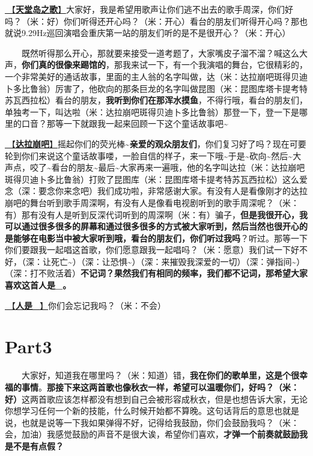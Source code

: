 \documentclass[]{ctexbook}
\begin{document}
\hyperref[haven-song]{🎵【\textbf{天堂岛之歌}】}大家好，我是希望用歌声让你们逃不出去的歌手周深，你们好吗？（米：好）你们听得还开心吗？（米：开心）看台的朋友们听得开心吗？那也就说9.29Hz巡回演唱会重庆第一站的朋友们听的是不是很开心？（米：开心）

  既然听得那么开心，那就要来接受一道考题了，大家嘴皮子溜不溜？喊这么大声，\textbf{你们真的很像来踢馆的}，那我来试一下，有一个我演唱的舞台，它很精彩的，一个非常美好的通话故事，里面的主人翁的名字叫做，达（米：达拉崩吧斑得贝迪卜多比鲁翁）厉害了，他砍向的那条巨龙的名字叫做昆图（米：昆图库塔卡提考特苏瓦西拉松）看台的朋友，\textbf{我听到你们在那浑水摸鱼}，不得行哦，看台的朋友们，单独考一下，叫达啦（米：达拉崩吧斑得贝迪卜多比鲁翁）那登一下，登一下是哪里的口音？那等一下就跟我一起来回顾一下这个童话故事吧\textasciitilde{}

\hyperref[dalabengba]{🎵【\textbf{达拉崩吧}】}摇起你们的荧光棒\textasciitilde{}\textbf{亲爱的观众朋友们}，你们复习好了吗？现在可要轮到你们来说这个童话故事喽，一脸自信的样子，来一下哦\textasciitilde 于是\textasciitilde 砍向\textasciitilde 然后\textasciitilde 大声点，咬了\textasciitilde 看台的朋友\textasciitilde 最后\textasciitilde 大家再来一遍哦，他的名字叫达拉（米：达拉崩吧斑得贝迪卜多比鲁翁）打败了昆图库（米：昆图库塔卡提考特苏瓦西拉松）这么爱念（深：要念你来念吧）我们成功啦，非常感谢大家。有没有人是看像刚才的达拉崩吧的舞台听到歌手周深啊，有没有人是像看电视剧听到的歌手周深呢？（米：有）那有没有人是听到反深代词听到的周深啊（米：有）骗子，\textbf{但是我很开心，我可以通过很多很多的屏幕和通过很多很多的方式被大家听到，然后当然也很开心的是能够在电影当中被大家听到哦，看台的朋友们，你们听过我吗}？听过。那等一下你们要跟我一起唱这首歌，你们愿意跟我一起唱吗？（米：愿意）我们试一下好不好，（深：让死亡\textasciitilde）（深：让恐惧\textasciitilde）（深：来摧毁我深爱的一切）（深：弹指间\textasciitilde）（深：打不败活着）\textbf{不记词？果然我们有相同的频率，我们都不记词，那希望大家喜欢这首人是\_。}

\hyperref[renshi]{🎵【\textbf{人是\_}】}你们会忘记我吗？（米：不会）

\section{Part3}\label{chongqing-20241006-part3}

  大家好，知道我在哪里吗？（米：知道）错，\textbf{我在你们的歌单里，这是个很幸福的事情}。\textbf{那接下来这两首歌也像秋衣一样，希望可以温暖你们，好吗？（米：好）}这两首歌应该怎样都没有想到自己会被形容成秋衣，但是也想告诉大家，无论你想学习任何一个新的技能，什么时候开始都不算晚。这句话背后的意思也就是说，也就是说等一下我如果弹得不好，记得给我鼓励，你们会鼓励我吗？（米：会，加油）我感觉鼓励的声音不是很大诶，希望你们喜欢，\textbf{才弹一个前奏就鼓励我是不是有点假？}
\end{document}
